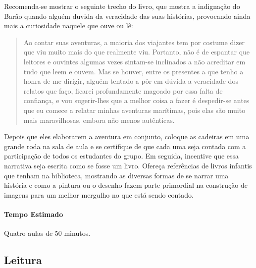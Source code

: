 \documentclass[11pt]{extarticle}
\begin{document}

Recomenda-se mostrar o seguinte trecho do livro, que mostra a indignação do Barão quando alguém duvida da veracidade das suas histórias, provocando ainda mais a curiosidade naquele que ouve ou lê:

\begin{quote}

Ao contar suas aventuras, a maioria dos viajantes tem por costume dizer que viu muito mais do que realmente viu. Portanto, não é de espantar que leitores e ouvintes algumas vezes sintam-se inclinados a não acreditar em tudo que leem e ouvem. Mas se houver, entre os presentes a que tenho a honra de me dirigir, alguém tentado a pôr em dúvida a veracidade dos relatos que faço, ficarei profundamente magoado por essa falta de confiança, e vou sugerir-lhes que a melhor coisa a fazer é despedir-se antes que eu comece a relatar minhas aventuras marítimas, pois elas são muito mais maravilhosas, embora não menos autênticas.

\end{quote}

Depois que eles elaborarem a aventura em conjunto, coloque as cadeiras em uma grande roda na sala de aula e se certifique de que cada uma seja contada com a participação de todos os estudantes do grupo. Em seguida, incentive que essa narrativa seja escrita como se fosse um livro. Ofereça referências de livros infantis que tenham na biblioteca, mostrando as diversas formas de se narrar uma história e como a pintura ou o desenho fazem parte primordial na construção de imagens para um melhor mergulho no que está sendo contado. 


\paragraph{Tempo Estimado} Quatro aulas de 50 minutos. 

\subsection{Leitura}
\end{document}
